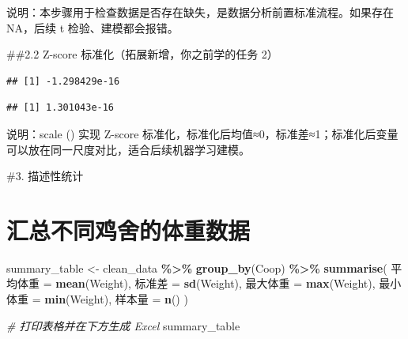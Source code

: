 \documentclass[
]{article}
\newenvironment{Shaded}{\begin{snugshade}}{\end{snugshade}}
\newcommand{\AttributeTok}[1]{\textcolor[rgb]{0.13,0.29,0.53}{#1}}
\newcommand{\CommentTok}[1]{\textcolor[rgb]{0.56,0.35,0.01}{\textit{#1}}}
\newcommand{\FunctionTok}[1]{\textcolor[rgb]{0.13,0.29,0.53}{\textbf{#1}}}
\newcommand{\NormalTok}[1]{#1}
\newcommand{\OtherTok}[1]{\textcolor[rgb]{0.56,0.35,0.01}{#1}}
\newcommand{\SpecialCharTok}[1]{\textcolor[rgb]{0.81,0.36,0.00}{\textbf{#1}}}
\begin{document}
说明：本步骤用于检查数据是否存在缺失，是数据分析前置标准流程。如果存在
NA，后续 t 检验、建模都会报错。

\#\#2.2 Z-score 标准化（拓展新增，你之前学的任务 2）

\begin{Shaded}
\end{Shaded}

\begin{verbatim}
## [1] -1.298429e-16
\end{verbatim}

\begin{Shaded}
\end{Shaded}

\begin{verbatim}
## [1] 1.301043e-16
\end{verbatim}

说明：scale () 实现 Z-score
标准化，标准化后均值≈0，标准差≈1；标准化后变量可以放在同一尺度对比，适合后续机器学习建模。

\#3. 描述性统计

\section{汇总不同鸡舍的体重数据}\label{ux6c47ux603bux4e0dux540cux9e21ux820dux7684ux4f53ux91cdux6570ux636e}

\begin{Shaded}
\begin{Highlighting}[]
\NormalTok{summary\_table }\OtherTok{\textless{}{-}}\NormalTok{ clean\_data }\SpecialCharTok{\%\textgreater{}\%}
  \FunctionTok{group\_by}\NormalTok{(Coop) }\SpecialCharTok{\%\textgreater{}\%}
  \FunctionTok{summarise}\NormalTok{(}
\NormalTok{    平均体重 }\OtherTok{=} \FunctionTok{mean}\NormalTok{(Weight),}
\NormalTok{    标准差 }\OtherTok{=} \FunctionTok{sd}\NormalTok{(Weight),}
\NormalTok{    最大体重 }\OtherTok{=} \FunctionTok{max}\NormalTok{(Weight),}
\NormalTok{    最小体重 }\OtherTok{=} \FunctionTok{min}\NormalTok{(Weight),}
\NormalTok{    样本量 }\OtherTok{=} \FunctionTok{n}\NormalTok{()}
\NormalTok{  )}

\CommentTok{\# 打印表格并在下方生成 Excel}
\NormalTok{summary\_table}
\end{Highlighting}
\end{Shaded}
\end{document}
